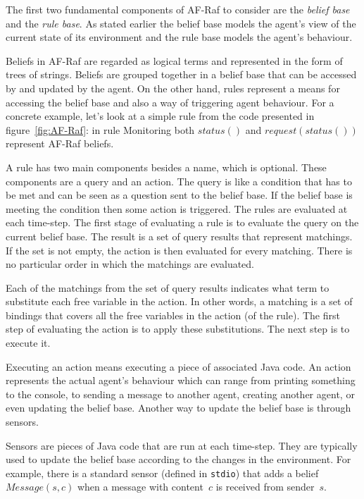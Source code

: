 \documentclass[a4paper,12pt,oneside,fleqn]{book} %
\begin{document}
The first two fundamental components of AF-Raf to consider are the
\textit{belief base} and the \textit{rule base}. As stated earlier the
belief base models the agent's view of the current state of its environment
and the rule base models the agent's behaviour.

Beliefs in AF-Raf are regarded as logical terms and represented in the form
of trees of strings. Beliefs are grouped together in a belief base that can
be accessed by and updated by the agent. On the other hand, rules represent
a means for accessing the belief base and also a way of triggering agent
behaviour. For a concrete example, let's look at a simple rule from the
code presented in figure~\ref{fig:AF-Raf}: in rule Monitoring both
$status()$ and $request(status())$ represent AF-Raf beliefs.

A rule has two main components besides a name, which is optional. These
components are a query and an action. The query is like a condition that
has to be met and can be seen as a question sent to the belief base. If the
belief base is meeting the condition then some action is triggered. The
rules are evaluated at each time-step. The first stage of evaluating a rule
is to evaluate the query on the current belief base. The result is a set of
query results that represent matchings. If the set is not empty, the
action is then evaluated for every matching. There is no particular order
in which the matchings are evaluated. 

Each of the matchings from the set of query results indicates what term
to substitute each free variable in the action. In other words, a matching
is a set of bindings that covers all the free variables in the action (of
the rule). The first step of evaluating the action is to apply these
substitutions. The next step is to execute it.

Executing an action means executing a piece of associated Java code.
An action represents the actual agent's behaviour which can
range from printing something to the console, to sending a message to
another agent, creating another agent, or even updating the belief base.
Another way to update the belief base is through sensors.

Sensors are pieces of Java code that are run at each time-step. They are
typically used to update the belief base according to the changes in the
environment. For example, there is a standard sensor (defined in
\texttt{stdio}) that adds a belief $\mathit{Message}(s,c)$ when a message
with content~$c$ is received from sender~$s$.
\end{document}
